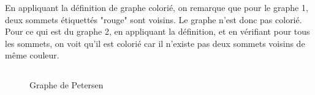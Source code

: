 En appliquant la définition de graphe colorié, on remarque que pour le graphe 1, deux sommets étiquettés "rouge" sont voisins. Le graphe n'est donc pas colorié.\\
Pour ce qui est du graphe 2, en appliquant la définition, et en vérifiant pour tous les sommets, on voit qu'il est colorié car il n'existe pas deux sommets voisins de même couleur.

\subsection{}

\begin{figure}[H]
    \centering
    \caption{Graphe de Petersen}
    \label{fig:part1:peterson}
\end{figure}

